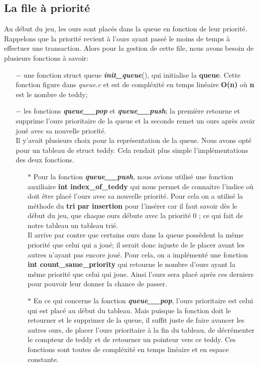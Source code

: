 \documentclass[a4paper,12pt]{article}
\begin{document}
  \subsection{La file à priorité}
Au début du jeu, les ours sont placés dans la queue en fonction de leur priorité. Rappelons que la priorité revient à l'ours ayant passé le moins de temps à effectuer une transaction. Alors pour la gestion de cette file, nous avons besoin de plusieurs fonctions à savoir:
\begin{itemize}

\item[$-$] une fonction struct queue \emph{\textbf{init\_queue}}(), qui initialise la \textbf{queue}. Cette fonction figure dans \emph{queue.c} et est de compléxité en temps linéaire \textbf{O(n)} où \textbf{n} est le nombre de teddy;
\newline
\item[$-$] les fonctions \emph{\textbf{queue\_\_pop}} et \emph{\textbf{queue\_\_push}}; la première retourne et supprime l'ours prioritaire de la queue et la seconde remet un ours après avoir joué avec sa nouvelle priorité.\\
Il y'avait plusieurs choix pour la représentation de la queue. Nous avons opté pour un tableau de struct teddy. Cela rendait plus simple l'implémentations des deux fonctions.
\newline
\begin{itemize}

\item [$\ast$] Pour la fonction \emph{\textbf{queue\_\_push}}, nous avions utilisé une fonction auxiliaire \textbf{int index\_of\_teddy} qui nous permet de connaitre l'indice où doit être placé l'ours avec sa nouvelle priorité. Pour cela on a utilisé la méthode du \textbf{tri par insertion} pour l'insérer car il faut savoir dès le début du jeu, que chaque ours débute avec la priorité 0 ; ce qui fait de notre tableau un tableau trié. \\
Il arrive par contre que certains ours dans la queue possèdent la même priorité que celui qui a joué; il serait donc injuste de le placer avant les autres n'ayant pas encore joué. Pour cela, on a implémenté une fonction \textbf{int count\_same\_priority} qui retourne le nombre d'ours ayant la même priorité que celui qui joue. Ainsi l'ours sera placé après ces derniers pour pouvoir leur donner la chance de passer.
\newline
\item [$\ast$] En ce qui concerne la fonction \emph{\textbf{queue\_\_pop}}, l'ours prioritaire est celui qui est placé au début du tableau. Mais puisque la fonction doit le retourner et le supprimer de la queue, il suffit juste de faire avancer les autres ours, de placer l'ours prioritaire à la fin du tableau, de décrémenter le compteur de teddy et de retourner un pointeur vers ce teddy.
Ces fonctions sont toutes de compléxité en temps linéaire et en espace constante.
\newline
\end{itemize}
\end{itemize}
\end{document}
